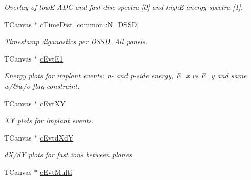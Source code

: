\begin{DoxyCompactItemize}
\begin{DoxyCompactList}\small\item\em Overlay of low\-E A\-D\-C and fast disc spectra \mbox{[}0\mbox{]} and high\-E energy spectra \mbox{[}1\mbox{]}. \end{DoxyCompactList}\item 
\hypertarget{classAnalysis_aa872f11035368d0881df28ea9acc3162}{T\-Canvas $\ast$ \hyperlink{classAnalysis_aa872f11035368d0881df28ea9acc3162}{c\-Time\-Dist} \mbox{[}common\-::\-N\-\_\-\-D\-S\-S\-D\mbox{]}}\label{classAnalysis_aa872f11035368d0881df28ea9acc3162}

\begin{DoxyCompactList}\small\item\em Timestamp diganostics per D\-S\-S\-D. All panels. \end{DoxyCompactList}\item 
\hypertarget{classAnalysis_afa96de1473b949006d70eee69b5cef19}{T\-Canvas $\ast$ \hyperlink{classAnalysis_afa96de1473b949006d70eee69b5cef19}{c\-Evt\-E1}}\label{classAnalysis_afa96de1473b949006d70eee69b5cef19}

\begin{DoxyCompactList}\small\item\em Energy plots for implant events\-: n-\/ and p-\/side energy, E\-\_\-x vs E\-\_\-y and same w/\&w/o flag constraint. \end{DoxyCompactList}\item 
\hypertarget{classAnalysis_a15877d06b5e868663c8c9370b0199444}{T\-Canvas $\ast$ \hyperlink{classAnalysis_a15877d06b5e868663c8c9370b0199444}{c\-Evt\-X\-Y}}\label{classAnalysis_a15877d06b5e868663c8c9370b0199444}

\begin{DoxyCompactList}\small\item\em X\-Y plots for implant events. \end{DoxyCompactList}\item 
\hypertarget{classAnalysis_af4417b27547b7e1cbd24ef2c45aab990}{T\-Canvas $\ast$ \hyperlink{classAnalysis_af4417b27547b7e1cbd24ef2c45aab990}{c\-Evtd\-Xd\-Y}}\label{classAnalysis_af4417b27547b7e1cbd24ef2c45aab990}

\begin{DoxyCompactList}\small\item\em d\-X/d\-Y plots for fast ions between planes. \end{DoxyCompactList}\item 
\hypertarget{classAnalysis_a11acde7abb15b710531805831da058f4}{T\-Canvas $\ast$ \hyperlink{classAnalysis_a11acde7abb15b710531805831da058f4}{c\-Evt\-Multi}}\label{classAnalysis_a11acde7abb15b710531805831da058f4}


\end{DoxyCompactItemize}
